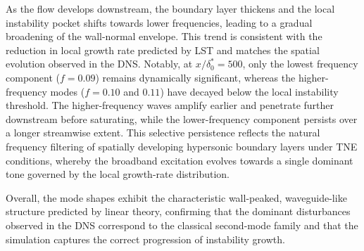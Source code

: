 As the flow develops downstream, the boundary layer thickens and the local instability pocket shifts towards lower frequencies, leading to a gradual broadening of the wall-normal envelope. This trend is consistent with the reduction in local growth rate predicted by \gls{LST} and matches the spatial evolution observed in the \gls{DNS}. Notably, at $x/\delta^{*}_{0} = 500$, only the lowest frequency component ($f = 0.09$) remains dynamically significant, whereas the higher-frequency modes ($f = 0.10$ and $0.11$) have decayed below the local instability threshold. The higher-frequency waves amplify earlier and penetrate further downstream before saturating, while the lower-frequency component persists over a longer streamwise extent. This selective persistence reflects the natural frequency filtering of spatially developing hypersonic boundary layers under \gls{TNE} conditions, whereby the broadband excitation evolves towards a single dominant tone governed by the local growth-rate distribution.

Overall, the mode shapes exhibit the characteristic wall-peaked, waveguide-like structure predicted by linear theory, confirming that the dominant disturbances observed in the \gls{DNS} correspond to the classical second-mode family and that the simulation captures the correct progression of instability growth.


